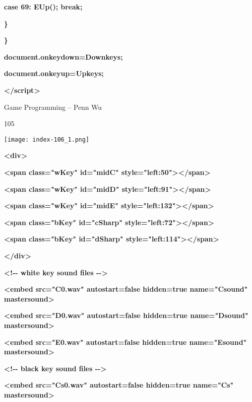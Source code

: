 \documentclass[
]{article}
\begin{document}
\textbf{case 69: EUp(); break;}

\textbf{\}}

\textbf{\}}

\textbf{document.onkeydown=Downkeys;}

\textbf{document.onkeyup=Upkeys;}

\textbf{\textless/script\textgreater{}}

\textbf{}

Game Programming -- Penn Wu

105

\protect\hypertarget{index_split_007.htmlux5cux23p106}{}{}\texttt{[image: index-106\_1.png]}

\textbf{}

\textbf{\textless div\textgreater{}}

\textbf{}

\textbf{\textless span class="wKey" id="midC"
style="left:50"\textgreater\textless/span\textgreater{}}

\textbf{\textless span class="wKey" id="midD"
style="left:91"\textgreater\textless/span\textgreater{}}

\textbf{\textless span class="wKey" id="midE"
style="left:132"\textgreater\textless/span\textgreater{}}

\textbf{}

\textbf{\textless span class="bKey" id="cSharp"
style="left:72"\textgreater\textless/span\textgreater{}}

\textbf{\textless span class="bKey" id="dSharp"
style="left:114"\textgreater\textless/span\textgreater{}}

\textbf{\textless/div\textgreater{}}

\textbf{}

\textbf{\textless!-\/- white key sound files -\/-\textgreater{}}

\textbf{\textless embed src="C0.wav" autostart=false hidden=true
name="Csound" mastersound\textgreater{}}

\textbf{\textless embed src="D0.wav" autostart=false hidden=true
name="Dsound" mastersound\textgreater{}}

\textbf{\textless embed src="E0.wav" autostart=false hidden=true
name="Esound" mastersound\textgreater{}}

\textbf{}

\textbf{\textless!-\/- black key sound files -\/-\textgreater{}}

\textbf{\textless embed src="Cs0.wav" autostart=false hidden=true
name="Cs" mastersound\textgreater{}}
\end{document}
